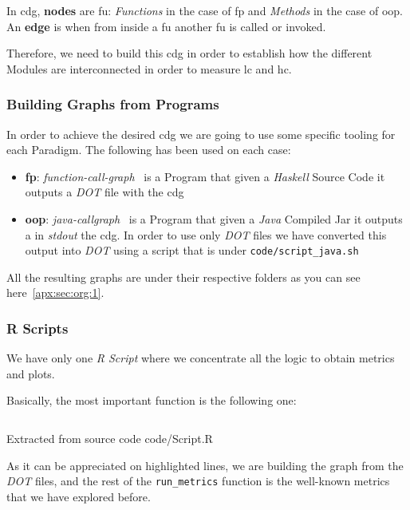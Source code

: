 \documentclass[12pt, a4paper]{article}
\begin{document}
In \acrshort{cdg}, \textbf{nodes} are \acrlong{fu}: \textit{Functions} in the case of \acrshort{fp} and \textit{Methods} in the case of \acrshort{oop}.
An \textbf{edge} is when from inside a \acrshort{fu} another \acrshort{fu} is called or invoked.

Therefore, we need to build this \acrlong{cdg} in order to establish how the different Modules are interconnected in order to measure \acrshort{lc} and \acrshort{hc}.

\subsubsection{Building Graphs from Programs}
In order to achieve the desired \acrlong{cdg} we are going to use some specific tooling for each Paradigm.
The following has been used on each case:

\begin{itemize}
    \item \textbf{\acrlong{fp}}: \textit{function-call-graph}~\cite{fp_callgraph} is a Program that given a \textit{Haskell} Source Code it outputs a \textit{DOT} file with the \acrlong{cdg}
    \item \textbf{\acrlong{oop}}: \textit{java-callgraph}~\cite{java_callgraph} is a Program that given a \textit{Java} Compiled Jar it outputs a in \textit{stdout} the \acrlong{cdg}. In order to use only \textit{DOT} files we have converted this output into \textit{DOT} using a script that is under \texttt{code/script_java.sh}
\end{itemize}

All the resulting graphs are under their respective folders as you can see here~\ref{apx:sec:org:1}.

\subsubsection{R Scripts}
We have only one \textit{R Script} where we concentrate all the logic to obtain metrics and plots. 

Basically, the most important function is the following one:

\begin{listing}[H]
    \inputminted[firstline=18, lastline=46, breaklines, highlightlines={19-23}]{R}{../code/Solution.R}
    \caption{Extracted from source code code/Script.R}
    \label{src:script:1}
\end{listing}
  
As it can be appreciated on highlighted lines, we are building the graph from the \textit{DOT} files, 
and the rest of the \texttt{run_metrics} function is the well-known metrics that we have explored before.   
\end{document}
